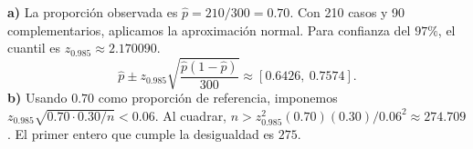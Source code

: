 \textbf{a)} La proporción observada es $\hat p=210/300=0.70$.
Con 210 casos y 90 complementarios, aplicamos la aproximación normal.
Para confianza del $97\%$, el cuantil es $z_{0.985}\approx2.170090$.
\[
\hat p\pm z_{0.985}\sqrt{\frac{\hat p(1-\hat p)}{300}}
\approx\boxed{[0.6426,\ 0.7574]}.
\]
\textbf{b)} Usando $0.70$ como proporción de referencia, imponemos
$z_{0.985}\sqrt{0.70\cdot0.30/n}<0.06$. Al cuadrar,
$n>z_{0.985}^2(0.70)(0.30)/0.06^2\approx274.709$.
El primer entero que cumple la desigualdad es $\boxed{275}$.
